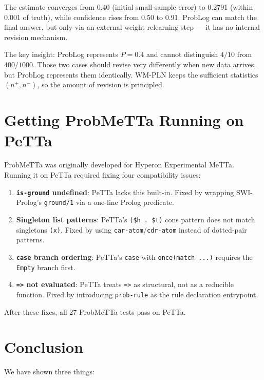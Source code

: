 \documentclass[11pt,a4paper]{article}
\theoremstyle{definition}
\begin{document}
The estimate converges from 0.40 (initial small-sample error) to 0.2791
(within 0.001 of truth), while confidence rises from 0.50 to 0.91.
ProbLog can match the final answer, but only via an external
weight-relearning step --- it has no internal revision mechanism.

The key insight: ProbLog represents $P = 0.4$ and cannot distinguish
$4/10$ from $400/1000$. Those two cases should revise very differently
when new data arrives, but ProbLog represents them identically.
WM-PLN keeps the sufficient statistics $(n^+, n^-)$, so
the amount of revision is principled.

\section{Getting ProbMeTTa Running on PeTTa}

ProbMeTTa was originally developed for Hyperon Experimental MeTTa. Running
it on PeTTa required fixing four compatibility issues:

\begin{enumerate}
\item \textbf{\texttt{is-ground} undefined}: PeTTa lacks this built-in.
  Fixed by wrapping SWI-Prolog's \texttt{ground/1} via a one-line Prolog
  predicate.

\item \textbf{Singleton list patterns}: PeTTa's \texttt{(\$h . \$t)} cons
  pattern does not match singletons \texttt{(x)}. Fixed by using
  \texttt{car-atom}/\texttt{cdr-atom} instead of dotted-pair patterns.

\item \textbf{\texttt{case} branch ordering}: PeTTa's \texttt{case} with
  \texttt{once(match ...)} requires the \texttt{Empty} branch first.

\item \textbf{\texttt{=>} not evaluated}: PeTTa treats \texttt{=>} as
  structural, not as a reducible function. Fixed by introducing
  \texttt{prob-rule} as the rule declaration entrypoint.
\end{enumerate}

After these fixes, all 27 ProbMeTTa tests pass on PeTTa.

\section{Conclusion}

We have shown three things:
\end{document}
